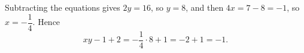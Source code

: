 Subtracting the equations gives $2y=16$, so $y=8$, and then $4x=7-8=-1$, so $x=-\dfrac14$. Hence
\[xy-1+2=-\dfrac14\cdot8+1=-2+1=\boxed{-1}.\]
